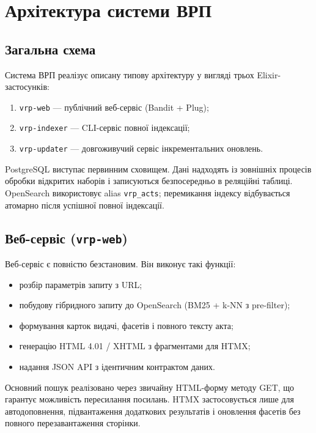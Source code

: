 \documentclass[12pt,a4paper]{article}
\begin{document}
\section{Архітектура системи ВРП}

\subsection{Загальна схема}

Система ВРП реалізує описану типову архітектуру у вигляді трьох Elixir-застосунків:

\begin{enumerate}
  \item \texttt{vrp-web} — публічний веб-сервіс (Bandit + Plug);
  \item \texttt{vrp-indexer} — CLI-сервіс повної індексації;
  \item \texttt{vrp-updater} — довгоживучий сервіс інкрементальних оновлень.
\end{enumerate}

PostgreSQL виступає первинним сховищем. Дані надходять із зовнішніх процесів обробки відкритих наборів і записуються безпосередньо в реляційні таблиці. OpenSearch використовує alias \texttt{vrp\_acts}; перемикання індексу відбувається атомарно після успішної повної індексації.

\subsection{Веб-сервіс (\texttt{vrp-web})}

Веб-сервіс є повністю безстановим. Він виконує такі функції:
\begin{itemize}
  \item розбір параметрів запиту з URL;
  \item побудову гібридного запиту до OpenSearch (BM25 + k-NN з pre-filter);
  \item формування карток видачі, фасетів і повного тексту акта;
  \item генерацію HTML 4.01 / XHTML з фрагментами для HTMX;
  \item надання JSON API з ідентичним контрактом даних.
\end{itemize}

Основний пошук реалізовано через звичайну HTML-форму методу GET, що гарантує можливість пересилання посилань. HTMX застосовується лише для автодоповнення, підвантаження додаткових результатів і оновлення фасетів без повного перезавантаження сторінки.
\end{document}
